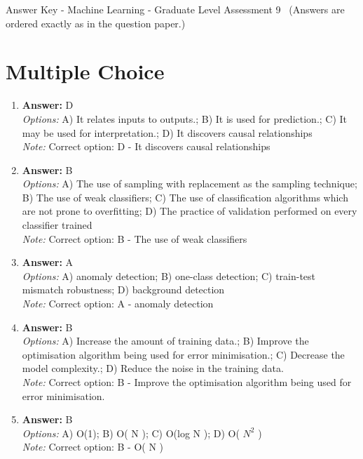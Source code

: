\documentclass[12pt]{article}
\begin{document}
\begin{center}
Answer Key - Machine Learning - Graduate Level Assessment 9 \
\small (Answers are ordered exactly as in the question paper.)
\end{center}

\section*{Multiple Choice}
\begin{enumerate}[label=\arabic*.]
\item \textbf{Answer:} D
\\ \textit{Options:} A) It relates inputs to outputs.; B) It is used for prediction.; C) It may be used for interpretation.; D) It discovers causal relationships
\\ \textit{Note:} Correct option: D - It discovers causal relationships
\item \textbf{Answer:} B
\\ \textit{Options:} A) The use of sampling with replacement as the sampling technique; B) The use of weak classifiers; C) The use of classification algorithms which are not prone to overfitting; D) The practice of validation performed on every classifier trained
\\ \textit{Note:} Correct option: B - The use of weak classifiers
\item \textbf{Answer:} A
\\ \textit{Options:} A) anomaly detection; B) one-class detection; C) train-test mismatch robustness; D) background detection
\\ \textit{Note:} Correct option: A - anomaly detection
\item \textbf{Answer:} B
\\ \textit{Options:} A) Increase the amount of training data.; B) Improve the optimisation algorithm being used for error minimisation.; C) Decrease the model complexity.; D) Reduce the noise in the training data.
\\ \textit{Note:} Correct option: B - Improve the optimisation algorithm being used for error minimisation.
\item \textbf{Answer:} B
\\ \textit{Options:} A) O(1); B) O( N ); C) O(log N ); D) O( $N^2$ )
\\ \textit{Note:} Correct option: B - O( N )
\end{enumerate}
\end{document}
